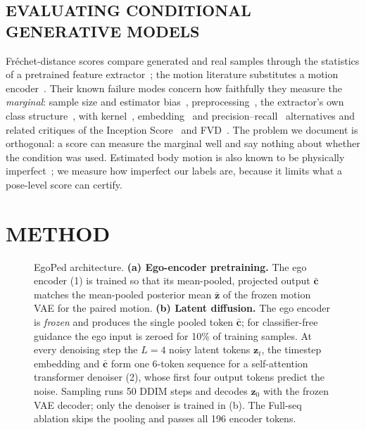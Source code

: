 \documentclass{ieeeoj}
\newcommand{\method}{EgoPed\xspace}
\newcommand{\fullseq}{Full-seq\xspace}
\begin{document}
\subsection{EVALUATING CONDITIONAL GENERATIVE MODELS}

Fréchet-distance scores compare generated and real samples through the statistics of a pretrained feature extractor~\cite{heusel2017fid}; the motion literature substitutes a motion encoder~\cite{guo2022humanml3d}. Their known failure modes concern how faithfully they measure the \emph{marginal}: sample size and estimator bias~\cite{chong2020unbiasedfid}, preprocessing~\cite{parmar2022cleanfid}, the extractor's own class structure~\cite{kynkaanniemi2023imagenetfid}, with kernel~\cite{binkowski2018mmdgan}, embedding~\cite{jayasumana2024cmmd} and precision--recall~\cite{kynkaanniemi2019precisionrecall} alternatives and related critiques of the Inception Score~\cite{barratt2018inception} and FVD~\cite{unterthiner2018fvd}. The problem we document is orthogonal: a score can measure the marginal well and say nothing about whether the condition was used. Estimated body motion is also known to be physically imperfect~\cite{rempe2020contact,xie2021physics,zhang2021motionpriors,yuan2023physdiff,mourot2022underpressure}; we measure how imperfect our labels are, because it limits what a pose-level score can certify.

\section{METHOD}
\label{sec:method}

\begin{figure}[t]
  \centering
  \resizebox{\linewidth}{!}{}
  \caption{\method architecture. \textbf{(a) Ego-encoder pretraining.} The ego encoder (1) is trained so that its mean-pooled, projected output $\bar{\mathbf{c}}$ matches the mean-pooled posterior mean $\bar{\mathbf{z}}$ of the frozen motion VAE for the paired motion. \textbf{(b) Latent diffusion.} The ego encoder is \emph{frozen} and produces the single pooled token $\bar{\mathbf{c}}$; for classifier-free guidance the ego input is zeroed for 10\% of training samples. At every denoising step the $L=4$ noisy latent tokens $\mathbf{z}_t$, the timestep embedding and $\bar{\mathbf{c}}$ form one 6-token sequence for a self-attention transformer denoiser (2), whose first four output tokens predict the noise. Sampling runs 50 DDIM steps and decodes $\mathbf{z}_0$ with the frozen VAE decoder; only the denoiser is trained in (b). The \fullseq ablation skips the pooling and passes all 196 encoder tokens.}
  \label{fig:architecture}
\end{figure}
\end{document}
